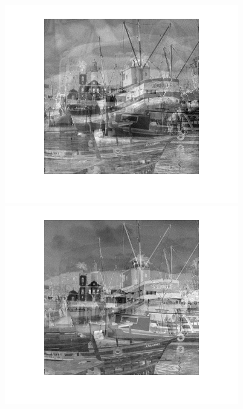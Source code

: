 \begin{figure}
{\begin{minipage}[b]{0.23\linewidth}
\includegraphics[width=1\linewidth]{images/jade_out1.png}\vspace{4pt}
\includegraphics[width=1\linewidth]{images/jade_out2.png}\vspace{4pt}

\end{minipage}}
\end{figure}
